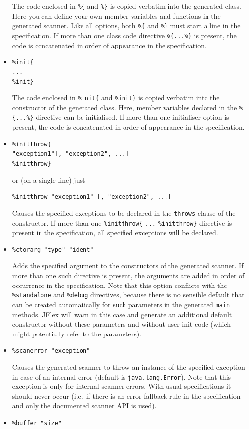\begin{itemize}
  The code enclosed in \texttt{\%\{} and \texttt{\%\}} is copied
  verbatim into the generated class. Here you can define your own member
  variables and functions in the generated scanner. Like all options,
  both \texttt{\%\{} and \texttt{\%\}} must start a line in the
  specification. If more than one class code directive
  \texttt{\%\{...\%\}} is present, the code is concatenated in order of
  appearance in the specification.
\item
  \texttt{\%init\{}\\\texttt{...}\\\texttt{\%init\}}

  The code enclosed in \texttt{\%init\{} and \texttt{\%init\}} is copied
  verbatim into the constructor of the generated class. Here, member
  variables declared in the \texttt{\%\{...\%\}} directive can be
  initialised. If more than one initialiser option is present, the code
  is concatenated in order of appearance in the specification.
\item
  \texttt{\%initthrow\{}\\\texttt{"exception1"{[},\ "exception2",\ ...{]}}\\\texttt{\%initthrow\}}

  or (on a single line) just

  \texttt{\%initthrow\ "exception1"\ {[},\ "exception2",\ ...{]}}

  Causes the specified exceptions to be declared in the \texttt{throws}
  clause of the constructor. If more than one \texttt{\%initthrow\{}
  \texttt{...} \texttt{\%initthrow\}} directive is present in the
  specification, all specified exceptions will be declared.
\item
  \texttt{\%ctorarg\ "type"\ "ident"}

  Adds the specified argument to the constructors of the generated
  scanner. If more than one such directive is present, the arguments are
  added in order of occurrence in the specification. Note that this
  option conflicts with the \texttt{\%standalone} and \texttt{\%debug}
  directives, because there is no sensible default that can be created
  automatically for such parameters in the generated \texttt{main}
  methods. JFlex will warn in this case and generate an additional
  default constructor without these parameters and without user init
  code (which might potentially refer to the parameters).
\item
  \texttt{\%scanerror\ "exception"}

  Causes the generated scanner to throw an instance of the specified
  exception in case of an internal error (default is
  \texttt{java.lang.Error}). Note that this exception is only for
  internal scanner errors. With usual specifications it should never
  occur (i.e.~if there is an error fallback rule in the specification
  and only the documented scanner API is used).
\item
  \texttt{\%buffer\ "size"}


\end{itemize}
